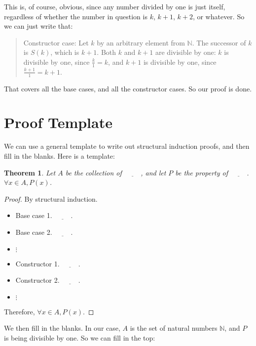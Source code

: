 \documentclass{book}
\numberwithin{equation}{chapter}
\newcommand{\blank}{\underline{\hspace{1cm}}}
\newtheorem*{anon-theorem}{Theorem}
\begin{document}
This is, of course, obvious, since any number divided by one is just itself, regardless of whether the number in question is $k$, $k + 1$, $k + 2$, or whatever. So we can just write that:

\begin{quote}
Constructor case: Let $k$ by an arbitrary element from $\mathbb{N}$. The successor of $k$ is $S(k)$, which is $k  + 1$. Both $k$ and $k + 1$ are divisible by one: $k$ is divisible by one, since $\frac{k}{1} = k$, and $k + 1$ is divisible by one, since $\frac{k + 1}{1} = k + 1$.
\end{quote}

\noindent
That covers all the base cases, and all the constructor cases. So our proof is done.


\section{Proof Template}

We can use a general template to write out structural induction proofs, and then fill in the blanks. Here is a template:

\noindent
\hrulefill

\begin{anon-theorem}
Let $A$ be the collection of $\blank$, and let $P$ be the property of $\blank$. $\forall x \in A, P(x)$.
\end{anon-theorem}

\begin{proof}
By structural induction.

\begin{itemize}
\item{Base case 1. $\blank$.}
\item{Base case 2. $\blank$.}
\item{$\vdots$}
\item{Constructor 1. $\blank$.}
\item{Constructor 2. $\blank$.}
\item{$\vdots$}
\end{itemize}

\noindent
Therefore, $\forall x \in A, P(x)$.
\end{proof}

\noindent
\hrulefill
\newline

\noindent
We then fill in the blanks. In our case, $A$ is the set of natural numbers $\mathbb{N}$, and $P$ is being divisible by one. So we can fill in the top:
\end{document}
